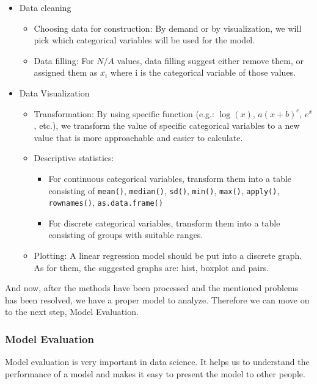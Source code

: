 \documentclass[a4paper]{article}
\numberwithin{equation}{section}
\begin{document}
\begin{itemize}
  \item Data cleaning
        \begin{itemize}
          \item Choosing data for construction: By demand or by visualization, we will pick which categorical variables will be used for the model.
          \item Data filling: For \(N/A\) values, data filling  suggest either remove them, or assigned them as \(\overline{x_i}\) where i is the categorical variable of those values.
        \end{itemize}
  \item Data Visualization
        \begin{itemize}
          \item Transformation: By using specific function (e.g.: \(\log(x)\), \(a{(x+b)}^c\), \(e^x\), etc.), we transform the value of specific categorical variables to a new value that is more approachable and easier to calculate.
          \item Descriptive statistics:
                \begin{itemize}
                  \item For continuous categorical variables, transform them into a table consisting of \texttt{mean()}, \texttt{median()}, \texttt{sd()}, \texttt{min()}, \texttt{max()}, \texttt{apply()},   \texttt{rownames()},
                        \texttt{as.data.frame()}
                  \item For discrete categorical variables, transform them into a table consisting of groups with suitable ranges.
                \end{itemize}
          \item Plotting: A linear regression model should be put into a discrete graph.
                As for them, the suggested graphs are: hist, boxplot and pairs.
        \end{itemize}
\end{itemize}

And now, after the methods have been processed and the mentioned problems has been resolved, we have a proper model to analyze.
Therefore we can move on to the next step, Model Evaluation.

\subsubsection{Model Evaluation}
Model evaluation is very important in data science.
It helps us to understand the performance of a model and makes it easy to present the model to other people.
\end{document}
